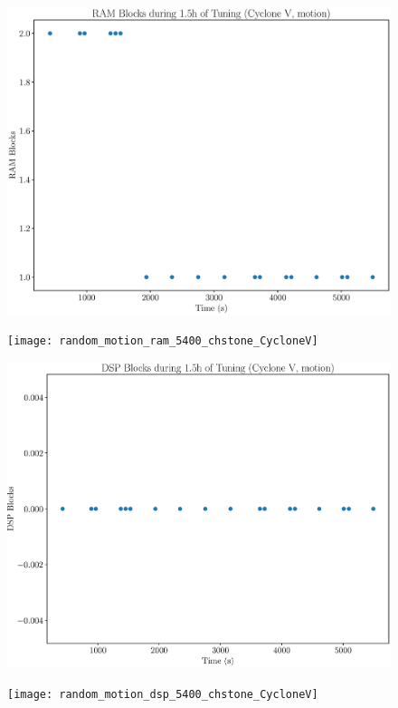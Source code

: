 \documentclass[12pt, a4paper]{article}
\begin{document}
\begin{figure}[htpb]
    \centering
    \noindent
    \begin{minipage}{.48\textwidth}
        \centering
        \includegraphics[scale=.25]{motion_ram_5400_chstone_CycloneV}
    \end{minipage}%
    \hfill
    \begin{minipage}{.48\textwidth}
        \centering
        \texttt{[image: random\_motion\_ram\_5400\_chstone\_CycloneV]}
    \end{minipage}%

    \begin{minipage}{.48\textwidth}
        \includegraphics[scale=.25]{motion_dsp_5400_chstone_CycloneV}
    \end{minipage}%
    \hfill
    \begin{minipage}{.48\textwidth}
        \texttt{[image: random\_motion\_dsp\_5400\_chstone\_CycloneV]}
    \end{minipage}%


\end{figure}
\end{document}
